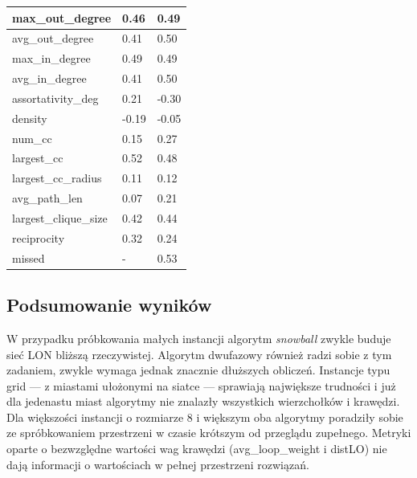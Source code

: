 \begin{table}[]
\begin{tabular}{|l|l|l|}
        max\_out\_degree      & 0.46          & 0.49           \\ \hline
        avg\_out\_degree      & 0.41          & 0.50           \\ \hline
        max\_in\_degree       & 0.49          & 0.49           \\ \hline
        avg\_in\_degree       & 0.41          & 0.50           \\ \hline
        assortativity\_deg    & 0.21          & -0.30          \\ \hline
        density               & -0.19         & -0.05          \\ \hline
        num\_cc               & 0.15          & 0.27           \\ \hline
        largest\_cc           & 0.52          & 0.48           \\ \hline
        largest\_cc\_radius   & 0.11          & 0.12           \\ \hline
        avg\_path\_len        & 0.07          & 0.21           \\ \hline
        largest\_clique\_size & 0.42          & 0.44           \\ \hline
        reciprocity           & 0.32          & 0.24           \\ \hline
        missed                & -             & 0.53           \\ \hline
    \end{tabular}
\end{table}


\subsection{Podsumowanie wyników}
W przypadku próbkowania małych instancji algorytm \textit{snowball} zwykle buduje sieć LON bliższą rzeczywistej.
Algorytm dwufazowy również radzi sobie z tym zadaniem, zwykle wymaga jednak znacznie dłuższych obliczeń.
Instancje typu grid --- z miastami ułożonymi na siatce --- sprawiają największe trudności i już dla jedenastu miast algorytmy nie znalazły
wszystkich wierzchołków i krawędzi.
Dla większości instancji o rozmiarze 8 i większym oba algorytmy poradziły sobie ze spróbkowaniem przestrzeni w czasie krótszym od przeglądu zupełnego.
Metryki oparte o bezwzględne wartości wag krawędzi (avg\_loop\_weight i distLO) nie dają informacji o wartościach w pełnej przestrzeni rozwiązań.

